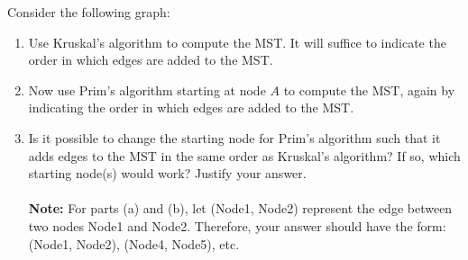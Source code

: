 \documentclass[9pt]{article}
\begin{document}
\item

  Consider the following graph:

  \begin{center}
  \end{center}

  \begin{enumerate}
      \item Use Kruskal's algorithm to compute the MST. It will suffice to indicate the order in which edges are added to the MST.
      \item Now use Prim's algorithm starting at node $A$ to compute the MST, again by indicating the order in which edges are added to the MST.
      \item Is it possible to change the starting node for Prim's algorithm such that it adds edges to the MST in the same order as Kruskal's algorithm? If so, which starting node(s) would work? Justify your answer. \\
      \\ \textbf{Note: } For parts (a) and (b), let (Node1, Node2) represent the edge between two nodes Node1 and Node2. Therefore, your answer should have the form: (Node1, Node2), (Node4, Node5), etc.
  \end{enumerate}
\end{document}
